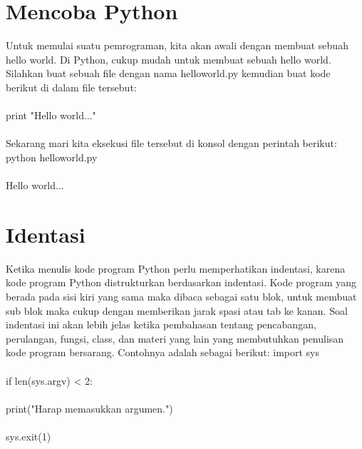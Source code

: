\section{Mencoba Python}
Untuk memulai suatu pemrograman, kita akan awali dengan membuat sebuah hello world. Di Python, cukup mudah untuk membuat sebuah hello world. Silahkan buat sebuah file dengan nama helloworld.py kemudian buat kode berikut di dalam file tersebut:
\paragraph{}
print "Hello world..."
\paragraph{}
Sekarang mari kita eksekusi file tersebut di konsol dengan perintah berikut:
python helloworld.py
\paragraph{}
Hello world...

\section{Identasi}
Ketika menulis kode program Python perlu memperhatikan indentasi, karena kode program Python distrukturkan berdasarkan indentasi. Kode program yang berada pada sisi kiri yang sama maka dibaca sebagai satu blok, untuk membuat sub blok maka cukup dengan memberikan jarak spasi atau tab ke kanan.
Soal indentasi ini akan lebih jelas ketika pembahasan tentang pencabangan, perulangan, fungsi, class, dan materi yang lain yang membutuhkan penulisan kode program bersarang.
Contohnya adalah sebagai berikut:
import sys
\paragraph{}
if len(sys.argv) < 2:
\paragraph{}
    print("Harap memasukkan argumen.")
    \paragraph{}
    sys.exit(1)
	


